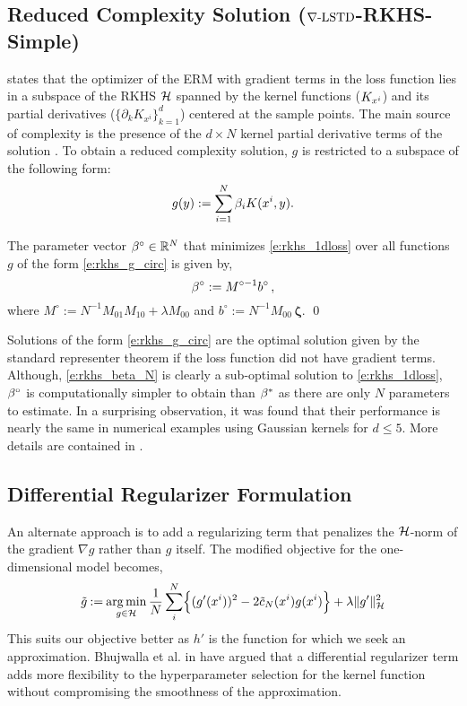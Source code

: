 \subsection{Reduced Complexity Solution ($\nabla\text{-LSTD}$-RKHS-Simple)}
 states that the optimizer of the ERM with gradient terms in the loss function lies in a subspace of the RKHS ${\cal H}$ spanned by the kernel functions ($K_{x^i}$) and its partial derivatives ($\{\partial_k K_{x^i}\}_{k=1}^d$) centered at the sample points. The main source of complexity is the presence of the $d \times N$ kernel partial derivative terms of the solution . To obtain a reduced complexity solution, $g$ is restricted to a subspace of the following form:
\begin{equation}
g(y)  := \sum_{i=1}^N \rkhsparam_i K(x^i,y).
\label{e:rkhs_g_circ}
\end{equation}
\begin{proposition}
	\label{t:bcirc}
	The parameter vector $\beta^\circ \in \mathbb{R}^N$ that minimizes \eqref{e:rkhs_1dloss}  over all functions $g$ of the form \eqref{e:rkhs_g_circ} is given by,
	\begin{equation}
	\rkhsparam^\circ  := M^{\circ -1} b^\circ   \,,
	\label{e:rkhs_beta_N}
	\end{equation}
	where $ M^\circ := N^{-1} M_{01} M_{10} + \lambda M_{00}$ and $ b^\circ := N^{-1} M_{00} \, \boldsymbol{\zeta} $.
	\qed
\end{proposition}
Solutions of the form \eqref{e:rkhs_g_circ} are the optimal solution given by the standard representer theorem if the loss function did not have gradient terms. 
Although, \eqref{e:rkhs_beta_N} is clearly a sub-optimal solution to \eqref{e:rkhs_1dloss}, $\beta^\circ$  is computationally simpler to obtain than $\beta^*$ as there are only $N$ parameters to estimate. In a surprising observation, it was found that their performance is nearly the same in numerical examples using Gaussian kernels for $d \leq 5$. More details are contained in .

\subsection{Differential Regularizer Formulation}
\label{s:diffReg} 

An alternate approach is to add a regularizing term that penalizes the ${\cal H}$-norm of the gradient $\nabla g$ rather than $g$ itself. The modified objective for the one-dimensional model becomes,
\begin{equation}
\tilg \eqdef \argmin_{g\in\clH} \frac{1}{N} \sum_{i}^N \Bigl\{ (g'(x^i))^2 - 2 \tilc_N(x^i) g(x^i)  \Bigr\} + \lambda \|g'\|_\clH^2
\label{e:rkhs_1dloss_diff}
\end{equation}
This suits our objective better as $h'$ is the function for which we seek an approximation. Bhujwalla et al. in \cite{bhujlaugil} have argued that a differential regularizer term adds more flexibility to the hyperparameter selection for the kernel function without compromising the smoothness of the approximation.

